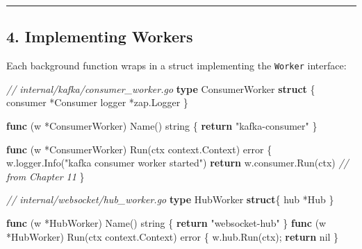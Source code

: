 \documentclass[
]{article}
\newenvironment{Shaded}{}{}
\newcommand{\CommentTok}[1]{\textcolor[rgb]{0.38,0.63,0.69}{\textit{#1}}}
\newcommand{\ControlFlowTok}[1]{\textcolor[rgb]{0.00,0.44,0.13}{\textbf{#1}}}
\newcommand{\DataTypeTok}[1]{\textcolor[rgb]{0.56,0.13,0.00}{#1}}
\newcommand{\KeywordTok}[1]{\textcolor[rgb]{0.00,0.44,0.13}{\textbf{#1}}}
\newcommand{\NormalTok}[1]{#1}
\newcommand{\OperatorTok}[1]{\textcolor[rgb]{0.40,0.40,0.40}{#1}}
\newcommand{\OtherTok}[1]{\textcolor[rgb]{0.00,0.44,0.13}{#1}}
\newcommand{\StringTok}[1]{\textcolor[rgb]{0.25,0.44,0.63}{#1}}
\begin{document}
\begin{center}\rule{0.5\linewidth}{0.5pt}\end{center}

\hypertarget{implementing-workers}{%
\subsection{4. Implementing Workers}\label{implementing-workers}}

Each background function wraps in a struct implementing the
\texttt{Worker} interface:

\begin{Shaded}
\begin{Highlighting}[]
\CommentTok{// internal/kafka/consumer\_worker.go}
\KeywordTok{type}\NormalTok{ ConsumerWorker }\KeywordTok{struct} \OperatorTok{\{}
\NormalTok{    consumer }\OperatorTok{*}\NormalTok{Consumer}
\NormalTok{    logger   }\OperatorTok{*}\NormalTok{zap}\OperatorTok{.}\NormalTok{Logger}
\OperatorTok{\}}

\KeywordTok{func} \OperatorTok{(}\NormalTok{w }\OperatorTok{*}\NormalTok{ConsumerWorker}\OperatorTok{)}\NormalTok{ Name}\OperatorTok{()} \DataTypeTok{string} \OperatorTok{\{} \ControlFlowTok{return} \StringTok{"kafka{-}consumer"} \OperatorTok{\}}

\KeywordTok{func} \OperatorTok{(}\NormalTok{w }\OperatorTok{*}\NormalTok{ConsumerWorker}\OperatorTok{)}\NormalTok{ Run}\OperatorTok{(}\NormalTok{ctx context}\OperatorTok{.}\NormalTok{Context}\OperatorTok{)} \DataTypeTok{error} \OperatorTok{\{}
\NormalTok{    w}\OperatorTok{.}\NormalTok{logger}\OperatorTok{.}\NormalTok{Info}\OperatorTok{(}\StringTok{"kafka consumer worker started"}\OperatorTok{)}
    \ControlFlowTok{return}\NormalTok{ w}\OperatorTok{.}\NormalTok{consumer}\OperatorTok{.}\NormalTok{Run}\OperatorTok{(}\NormalTok{ctx}\OperatorTok{)} \CommentTok{// from Chapter 11}
\OperatorTok{\}}

\CommentTok{// internal/websocket/hub\_worker.go}
\KeywordTok{type}\NormalTok{ HubWorker }\KeywordTok{struct}\OperatorTok{\{}\NormalTok{ hub }\OperatorTok{*}\NormalTok{Hub }\OperatorTok{\}}

\KeywordTok{func} \OperatorTok{(}\NormalTok{w }\OperatorTok{*}\NormalTok{HubWorker}\OperatorTok{)}\NormalTok{ Name}\OperatorTok{()} \DataTypeTok{string}                   \OperatorTok{\{} \ControlFlowTok{return} \StringTok{"websocket{-}hub"} \OperatorTok{\}}
\KeywordTok{func} \OperatorTok{(}\NormalTok{w }\OperatorTok{*}\NormalTok{HubWorker}\OperatorTok{)}\NormalTok{ Run}\OperatorTok{(}\NormalTok{ctx context}\OperatorTok{.}\NormalTok{Context}\OperatorTok{)} \DataTypeTok{error}  \OperatorTok{\{}\NormalTok{ w}\OperatorTok{.}\NormalTok{hub}\OperatorTok{.}\NormalTok{Run}\OperatorTok{(}\NormalTok{ctx}\OperatorTok{);} \ControlFlowTok{return} \OtherTok{nil} \OperatorTok{\}}
\end{Highlighting}
\end{Shaded}
\end{document}
